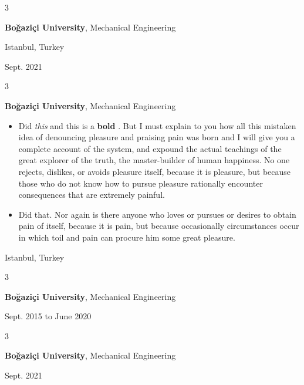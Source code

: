 \documentclass[10pt, letterpaper]{article}
\newenvironment{highlights}{
    \begin{itemize}[
        topsep=0.10 cm,
        parsep=0.10 cm,
        partopsep=0pt,
        itemsep=0pt,
        leftmargin=0.4 cm + 10pt
    ]
}{
    \end{itemize}
} %
\newenvironment{threecolentry}[3][]{
    \onecolentry
    \def\thirdColumn{#3}
    \setcolumnwidth{1 cm, \fill, 4.5 cm}
    \begin{paracol}{3}
    {\raggedright #2} \switchcolumn
}{
    \switchcolumn \raggedleft \thirdColumn
    \end{paracol}
    \endonecolentry
} %
\let\hrefWithoutArrow\href
\renewcommand{\href}[2]{\hrefWithoutArrow{#1}{\mbox{\ifthenelse{\equal{#2}{}}{ }{#2 }\raisebox{.15ex}{\footnotesize \faExternalLink*}}}}
\begin{document}
        \vspace{0.2 cm}

        \begin{threecolentry}{\textbf{}}{
            Istanbul, Turkey

        Sept. 2021
        }
            \textbf{Boğaziçi University}, Mechanical Engineering
        \end{threecolentry}

        \vspace{0.2 cm}

        \begin{threecolentry}{\textbf{}}{
            Istanbul, Turkey
        }
            \textbf{Boğaziçi University}, Mechanical Engineering
            \begin{highlights}
                \item Did \textit{this} and this is a \textbf{bold} \href{https://example.com}{link}. But I must explain to you how all this mistaken idea of denouncing pleasure and praising pain was born and I will give you a complete account of the system, and expound the actual teachings of the great explorer of the truth, the master-builder of human happiness. No one rejects, dislikes, or avoids pleasure itself, because it is pleasure, but because those who do not know how to pursue pleasure rationally encounter consequences that are extremely painful.
                \item Did that. Nor again is there anyone who loves or pursues or desires to obtain pain of itself, because it is pain, but because occasionally circumstances occur in which toil and pain can procure him some great pleasure.
            \end{highlights}
        \end{threecolentry}

        \vspace{0.2 cm}

        \begin{threecolentry}{\textbf{}}{
            Sept. 2015 to June 2020
        }
            \textbf{Boğaziçi University}, Mechanical Engineering
        \end{threecolentry}

        \vspace{0.2 cm}

        \begin{threecolentry}{\textbf{}}{
            Sept. 2021
        }
            \textbf{Boğaziçi University}, Mechanical Engineering
        \end{threecolentry}
\end{document}
